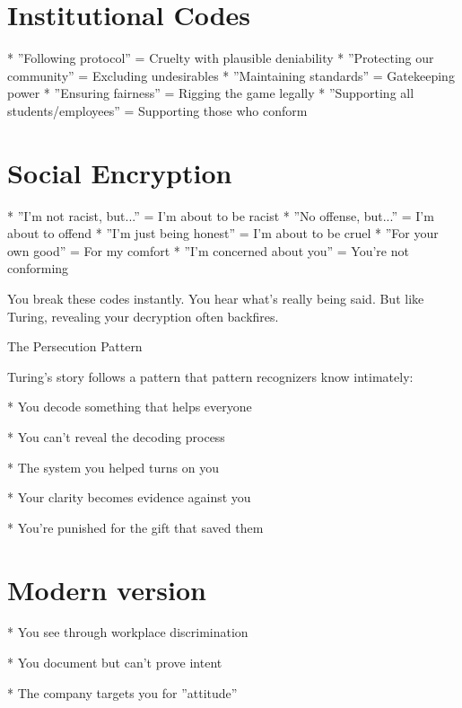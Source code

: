 \documentclass[12pt,oneside]{book}
\begin{document}
\section{Institutional Codes}

                    * ''Following protocol'' = Cruelty with plausible deniability
                    * ''Protecting our community'' = Excluding undesirables
                    * ''Maintaining standards'' = Gatekeeping power
                    * ''Ensuring fairness'' = Rigging the game legally
                    * ''Supporting all students/employees'' = Supporting those who conform

\section{Social Encryption}

                    * ''I'm not racist, but...'' = I'm about to be racist
                    * ''No offense, but...'' = I'm about to offend
                    * ''I'm just being honest'' = I'm about to be cruel
                    * ''For your own good'' = For my comfort
                    * ''I'm concerned about you'' = You're not conforming

You break these codes instantly. You hear what's really being said. But like Turing, revealing your decryption often backfires.

The Persecution Pattern

Turing's story follows a pattern that pattern recognizers know intimately:

                    * You decode something that helps everyone

                    * You can't reveal the decoding process

                    * The system you helped turns on you

                    * Your clarity becomes evidence against you

                    * You're punished for the gift that saved them

\section{Modern version}

                    * You see through workplace discrimination

                    * You document but can't prove intent

                    * The company targets you for ''attitude''
\end{document}
